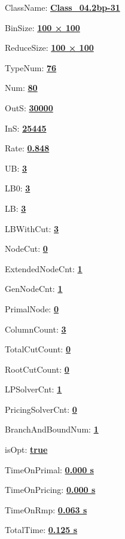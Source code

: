 \documentclass[11pt]{article}
\begin{document}
\pagestyle{empty}


ClassName: \underline{\textbf{Class_04.2bp-31}}
\par
BinSize: \underline{\textbf{100 × 100}}
\par
ReduceSize: \underline{\textbf{100 × 100}}
\par
TypeNum: \underline{\textbf{76}}
\par
Num: \underline{\textbf{80}}
\par
OutS: \underline{\textbf{30000}}
\par
InS: \underline{\textbf{25445}}
\par
Rate: \underline{\textbf{0.848}}
\par
UB: \underline{\textbf{3}}
\par
LB0: \underline{\textbf{3}}
\par
LB: \underline{\textbf{3}}
\par
LBWithCut: \underline{\textbf{3}}
\par
NodeCut: \underline{\textbf{0}}
\par
ExtendedNodeCnt: \underline{\textbf{1}}
\par
GenNodeCnt: \underline{\textbf{1}}
\par
PrimalNode: \underline{\textbf{0}}
\par
ColumnCount: \underline{\textbf{3}}
\par
TotalCutCount: \underline{\textbf{0}}
\par
RootCutCount: \underline{\textbf{0}}
\par
LPSolverCnt: \underline{\textbf{1}}
\par
PricingSolverCnt: \underline{\textbf{0}}
\par
BranchAndBoundNum: \underline{\textbf{1}}
\par
isOpt: \underline{\textbf{true}}
\par
TimeOnPrimal: \underline{\textbf{0.000 s}}
\par
TimeOnPricing: \underline{\textbf{0.000 s}}
\par
TimeOnRmp: \underline{\textbf{0.063 s}}
\par
TotalTime: \underline{\textbf{0.125 s}}
\par
\newpage
\end{document}
